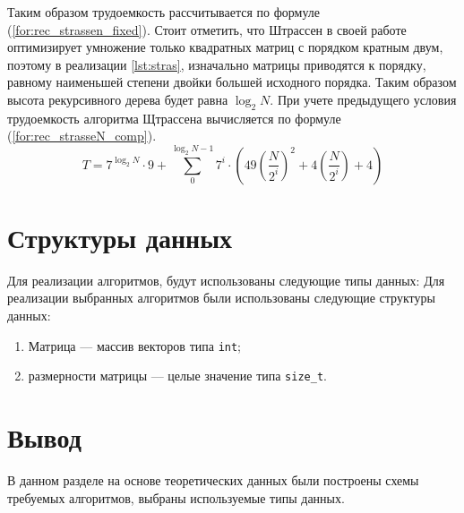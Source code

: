 Таким образом трудоемкость рассчитывается по формуле  (\ref{for:rec_strassen_fixed}). Стоит отметить, что Штрассен в своей работе оптимизирует умножение только квадратных матриц с порядком кратным двум, поэтому в реализации \ref{lst:stras}, изначально матрицы приводятся к порядку, равному наименьшей степени двойки большей исходного порядка. Таким образом высота рекурсивного дерева будет равна $\log_{2}{N}$. При учете предыдущего условия трудоемкость алгоритма Щтрассена вычисляется по формуле (\ref{for:rec_strasseN_comp}).
\begin{equation}
	\label{for:rec_strasseN_comp}
	T = 7^{\log_{2}{N}}\cdot 9+ \sum_{0}^{\log_{2}{N} - 1}{7^{i} \cdot (49(\frac{N}{2^i})^2 + 4(\frac{N}{2^i})+ 4)}
\end{equation}






\section{Структуры данных}

Для реализации алгоритмов, будут использованы следующие типы данных:
Для реализации выбранных алгоритмов были использованы следующие структуры данных:
\begin{enumerate}
	\item Матрица --- массив векторов типа \texttt{int};
	\item размерности матрицы --- целые значение типа \texttt{size\_t}.
\end{enumerate}



\section*{Вывод}

В данном разделе на основе теоретических данных были построены схемы требуемых алгоритмов, выбраны используемые типы данных.
